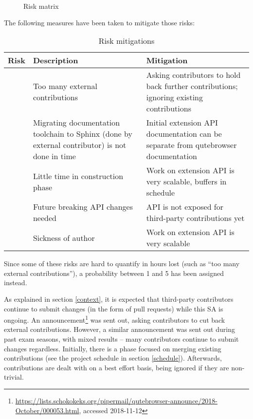 \begin{figure}[H]
  \caption{Risk matrix}
  \label{img:risiko}
\end{figure}

The following measures have been taken to mitigate those risks:

\begin{table}[H]
  \begin{tabulary}{\linewidth}{lLL}
    \toprule
    Risk & Description & Mitigation \\
    \midrule
     & Too many external contributions & Asking contributors to hold back further contributions; ignoring existing contributions  \\
    \hline
     & Migrating documentation toolchain to Sphinx (done by external contributor)
    is not done in time & Initial extension API documentation can be separate from
    qutebrowser documentation \\
    \hline
     & Little time in construction phase & Work on extension API is very
    scalable, buffers in schedule \\
    \hline
     & Future breaking API changes needed & API is not exposed for third-party
    contributions yet \\
    \hline
     & Sickness of author & Work on extension API is very scalable \\
    \bottomrule
  \end{tabulary}
  \caption{Risk mitigations}
\end{table}

Since some of these risks are hard to quantify in hours lost (such as ``too many
external contributions''), a probability between 1 and 5 has been assigned instead.

As explained in section \ref{context}, it is expected that third-party
contributors continue to submit changes (in the form of pull requests) while
this SA is ongoing. An
announcement\footnote{\url{https://lists.schokokeks.org/pipermail/qutebrowser-announce/2018-October/000053.html},
  accessed 2018-11-12} was sent out, asking contributors to cut back external
contributions. However, a similar announcement was sent out during past exam
seasons, with mixed results -- many contributors continue to submit changes
regardless. Initially, there is a phase focused on merging existing
contributions (see the project schedule in section \ref{schedule}). Afterwards,
contributions are dealt with on a best effort basis, being ignored if they
are non-trivial.

